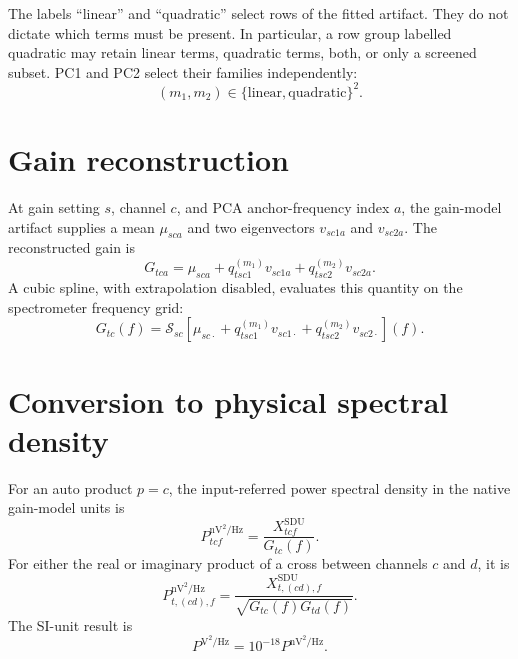 \documentclass[11pt]{article}
\newcommand{\SDU}{\mathrm{SDU}}
\begin{document}
The labels ``linear'' and ``quadratic'' select rows of the fitted artifact.
They do not dictate which terms must be present.  In particular, a row group
labelled quadratic may retain linear terms, quadratic terms, both, or only a
screened subset.  PC1 and PC2 select their families independently:
\begin{equation}
  (m_1,m_2) \in
  \{\mathrm{linear},\mathrm{quadratic}\}^2.
\end{equation}

\section{Gain reconstruction}

At gain setting $s$, channel $c$, and PCA anchor-frequency index $a$, the
gain-model artifact supplies a mean $\mu_{sca}$ and two eigenvectors
$v_{sc1a}$ and $v_{sc2a}$.  The reconstructed gain is
\begin{equation}
  G_{tca}
  = \mu_{sca}
    +q^{(m_1)}_{tsc1}v_{sc1a}
    +q^{(m_2)}_{tsc2}v_{sc2a}.
  \label{eq:gain-anchor}
\end{equation}
A cubic spline, with extrapolation disabled, evaluates this quantity on the
spectrometer frequency grid:
\begin{equation}
  G_{tc}(f)
  = \mathcal S_{sc}\!\left[
      \mu_{sc\cdot}
      +q^{(m_1)}_{tsc1}v_{sc1\cdot}
      +q^{(m_2)}_{tsc2}v_{sc2\cdot}
    \right](f).
  \label{eq:gain-interp}
\end{equation}

\section{Conversion to physical spectral density}

For an auto product $p=c$, the input-referred power spectral density in the
native gain-model units is
\begin{equation}
  P^{\mathrm{nV}^2/\mathrm{Hz}}_{tcf}
  = \frac{X^{\SDU}_{tcf}}{G_{tc}(f)}.
  \label{eq:auto-psd}
\end{equation}
For either the real or imaginary product of a cross between channels $c$ and
$d$, it is
\begin{equation}
  P^{\mathrm{nV}^2/\mathrm{Hz}}_{t,(cd),f}
  = \frac{X^{\SDU}_{t,(cd),f}}
         {\sqrt{G_{tc}(f)G_{td}(f)}}.
  \label{eq:cross-psd}
\end{equation}
The SI-unit result is
\begin{equation}
  P^{\mathrm{V}^2/\mathrm{Hz}} = 10^{-18}
  P^{\mathrm{nV}^2/\mathrm{Hz}}.
\end{equation}
\end{document}
